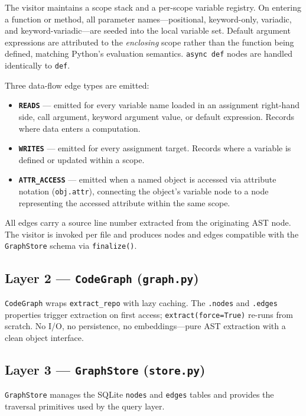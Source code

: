 \documentclass[10pt]{article}
\begin{document}
The visitor maintains a scope stack and a per-scope variable registry. On entering
a function or method, all parameter names---positional, keyword-only, variadic, and
keyword-variadic---are seeded into the local variable set. Default argument
expressions are attributed to the \emph{enclosing} scope rather than the function
being defined, matching Python's evaluation semantics. \texttt{async def} nodes are
handled identically to \texttt{def}.

Three data-flow edge types are emitted:

\begin{itemize}
\item \textbf{\texttt{READS}} --- emitted for every variable name loaded in an
assignment right-hand side, call argument, keyword argument value, or default
expression. Records where data enters a computation.
\item \textbf{\texttt{WRITES}} --- emitted for every assignment target. Records
where a variable is defined or updated within a scope.
\item \textbf{\texttt{ATTR\_ACCESS}} --- emitted when a named object is accessed
via attribute notation (\texttt{obj.attr}), connecting the object's variable node
to a node representing the accessed attribute within the same scope.
\end{itemize}

All edges carry a source line number extracted from the originating AST node.
The visitor is invoked per file and produces nodes and edges compatible with the
\texttt{GraphStore} schema via \texttt{finalize()}.

\subsection{Layer 2 --- \texttt{CodeGraph} (\texttt{graph.py})}

\texttt{CodeGraph} wraps \texttt{extract\_repo} with lazy caching. The
\texttt{.nodes} and \texttt{.edges} properties trigger extraction on first access;
\texttt{extract(force=True)} re-runs from scratch. No I/O, no persistence, no
embeddings---pure AST extraction with a clean object interface.

\subsection{Layer 3 --- \texttt{GraphStore} (\texttt{store.py})}
\label{sec:graphstore}

\texttt{GraphStore} manages the SQLite \texttt{nodes} and \texttt{edges} tables and
provides the traversal primitives used by the query layer.
\end{document}
